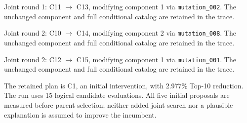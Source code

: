 Joint round 1: C11 $\rightarrow$ C13, modifying component 1 via \texttt{mutation\_002}. The unchanged component and full conditional catalog are retained in the trace.

Joint round 2: C10 $\rightarrow$ C14, modifying component 2 via \texttt{mutation\_008}. The unchanged component and full conditional catalog are retained in the trace.

Joint round 2: C12 $\rightarrow$ C15, modifying component 1 via \texttt{mutation\_001}. The unchanged component and full conditional catalog are retained in the trace.

The retained plan is C1, an initial intervention, with 2.977\% Top-10 reduction. The run uses 15 logical candidate evaluations. All five initial proposals are measured before parent selection; neither added joint search nor a plausible explanation is assumed to improve the incumbent.
